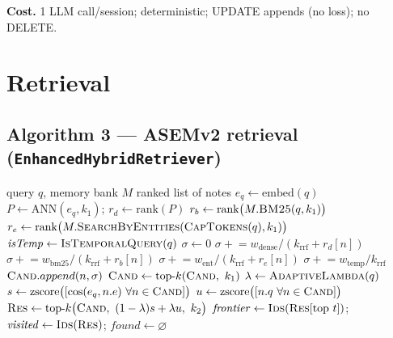 \documentclass[11pt]{article}
\newcommand{\ANN}{\mathrm{ANN}}
\newcommand{\cos}{\mathrm{cos}}
\newcommand{\embed}{\mathrm{embed}}
\newcommand{\rank}{\mathrm{rank}}
\newcommand{\zscore}{\mathrm{zscore}}
\newcommand{\topk}{\mathrm{top}\text{-}k}
\newcommand{\rrfk}{k_{\mathrm{rrf}}}
\begin{document}
\textbf{Cost.} 1 LLM call/session; deterministic; UPDATE appends (no loss); no DELETE.

\section*{Retrieval}

\subsection*{Algorithm 3 --- ASEMv2 retrieval (\texttt{EnhancedHybridRetriever})}
\begin{algorithm}[H]
\caption{ASEMv2 retrieval: RRF recall + N-hop BFS + global-graph re-rank.}
\label{alg:asemv2_retrieve}
\Require query $q$, memory bank $M$
\Ensure ranked list of notes
\State $e_q \leftarrow \embed(q)$
\State {}
\State $P \leftarrow \ANN(e_q, k_1)$; \State $r_d \leftarrow \rank(P)$
 \State $r_b \leftarrow \rank\big(M.\textsc{BM25}(q, k_1)\big)$ \EndIf
{} \State $r_e \leftarrow \rank\big(M.\textsc{SearchByEntities}(\textsc{CapTokens}(q), k_1)\big)$ \EndIf
\State $\mathit{isTemp} \leftarrow \textsc{IsTemporalQuery}(q)$
    \State $\sigma \leftarrow 0$
     \State $\sigma \mathrel{+}= w_{\mathrm{dense}} / (\rrfk + r_d[n])$ \EndIf
     \State $\sigma \mathrel{+}= w_{\mathrm{bm25}} / (\rrfk + r_b[n])$ \EndIf
     \State $\sigma \mathrel{+}= w_{\mathrm{ent}} / (\rrfk + r_e[n])$ \EndIf
     \State $\sigma \mathrel{+}= w_{\mathrm{temp}} / \rrfk$ \EndIf
    \If{$\cos(e_q, n.e) \ge \delta$ \textbf{or} $n \in r_b \cup r_e$} \State $\textsc{Cand}.append(n, \sigma)$ \EndIf
\EndFor
\State $\textsc{Cand} \leftarrow \topk(\textsc{Cand},\ k_1)$
\State {}
\State $\lambda \leftarrow \textsc{AdaptiveLambda}(q)$ 
\State $s \leftarrow \zscore\big([\cos(e_q, n.e)\ \forall n \in \textsc{Cand}]\big)$
\State $u \leftarrow \zscore\big([n.q\ \forall n \in \textsc{Cand}]\big)$
\State $\textsc{Res} \leftarrow \topk\big(\textsc{Cand},\ (1-\lambda)s + \lambda u,\ k_2\big)$
\State {}
\State $\mathit{frontier} \leftarrow \textsc{Ids}(\textsc{Res}[\text{top }t])$; \State $\mathit{visited} \leftarrow \textsc{Ids}(\textsc{Res})$; \State $\mathit{found} \leftarrow \varnothing$

\end{algorithm}
\end{document}
